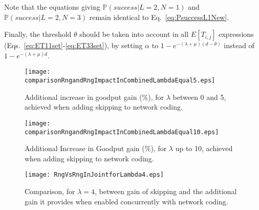 \documentclass[preprint,12pt]{elsarticle}
\theoremstyle{definition}
\theoremstyle{plain}
\theoremstyle{remark}
\renewcommand{\P}{\ensuremath{\mathbb{P}}}
\newcommand{\e}{e}
\begin{document}
Note that the equations giving $\P(success|L = 2, N =1)$ and $\P(success|L = 2, N =3)$ remain identical to Eq.~\eqref{eq:PsuccessL1New}.

Finally, the threshold $\theta$ should be taken into account in all $E[T_{i,j}]$ expressions (Eqs.~\eqref{eq:ET11set}-\eqref{eq:ET33set}), by setting $\alpha$ to $1 - \e^{-(\lambda + \mu)(d-\theta)}$ instead of $1 - \e^{-(\lambda + \mu)d}$.




\begin{figure}[t]
\begin{center}
  \texttt{[image: comparisonRngandRngImpactInCombinedLambdaEqual5.eps]}
\end{center}
  \caption{Additional increase in goodput gain (\%), for $\lambda$ between 0 and 5, achieved when adding skipping to network coding.}
  \label{fig:comparisonRngandRngImpactInCombinedLambdaEqual5}
\end{figure}

\begin{figure}[t]
\begin{center}
  \texttt{[image: comparisonRngandRngImpactInCombinedLambdaEqual10.eps]}
\end{center}
  \caption{Additional Increase in Goodput gain (\%), for $\lambda$ up to 10, achieved when adding skipping to network coding.}
  \label{fig:comparisonRngandRngImpactInCombinedLambdaEqual10}
\end{figure}


\begin{figure}[t]
\begin{center}
  \texttt{[image: RngVsRngInJointforLambda4.eps]}
\end{center}
  \caption{Comparison, for $\lambda = 4$, between gain of skipping and the additional gain it provides when enabled concurrently with network coding.}
  \label{fig:RngVsRngInJointforLambda4}
\end{figure}
\end{document}
